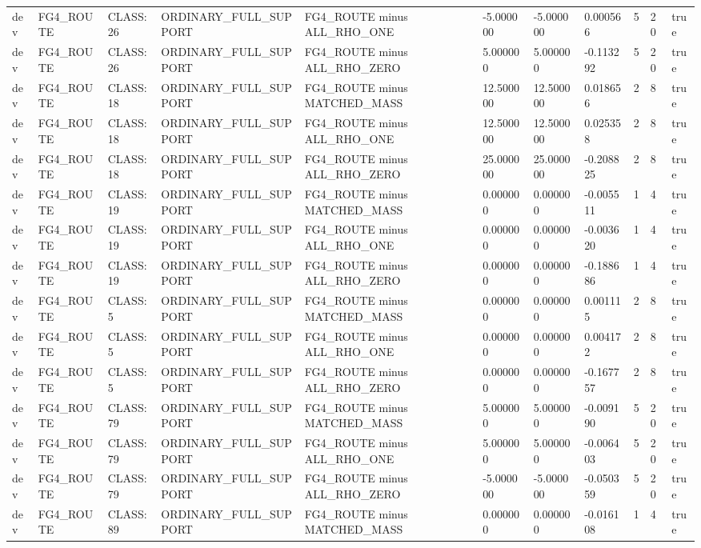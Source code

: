 \begin{tabular}{lllllllllll}
dev & FG4\_ROUTE & CLASS:26 & ORDINARY\_FULL\_SUPPORT & FG4\_ROUTE minus ALL\_RHO\_ONE & -5.000000 & -5.000000 & 0.000566 & 5 & 20 & true \\
dev & FG4\_ROUTE & CLASS:26 & ORDINARY\_FULL\_SUPPORT & FG4\_ROUTE minus ALL\_RHO\_ZERO & 5.000000 & 5.000000 & -0.113292 & 5 & 20 & true \\
dev & FG4\_ROUTE & CLASS:18 & ORDINARY\_FULL\_SUPPORT & FG4\_ROUTE minus MATCHED\_MASS & 12.500000 & 12.500000 & 0.018656 & 2 & 8 & true \\
dev & FG4\_ROUTE & CLASS:18 & ORDINARY\_FULL\_SUPPORT & FG4\_ROUTE minus ALL\_RHO\_ONE & 12.500000 & 12.500000 & 0.025358 & 2 & 8 & true \\
dev & FG4\_ROUTE & CLASS:18 & ORDINARY\_FULL\_SUPPORT & FG4\_ROUTE minus ALL\_RHO\_ZERO & 25.000000 & 25.000000 & -0.208825 & 2 & 8 & true \\
dev & FG4\_ROUTE & CLASS:19 & ORDINARY\_FULL\_SUPPORT & FG4\_ROUTE minus MATCHED\_MASS & 0.000000 & 0.000000 & -0.005511 & 1 & 4 & true \\
dev & FG4\_ROUTE & CLASS:19 & ORDINARY\_FULL\_SUPPORT & FG4\_ROUTE minus ALL\_RHO\_ONE & 0.000000 & 0.000000 & -0.003620 & 1 & 4 & true \\
dev & FG4\_ROUTE & CLASS:19 & ORDINARY\_FULL\_SUPPORT & FG4\_ROUTE minus ALL\_RHO\_ZERO & 0.000000 & 0.000000 & -0.188686 & 1 & 4 & true \\
dev & FG4\_ROUTE & CLASS:5 & ORDINARY\_FULL\_SUPPORT & FG4\_ROUTE minus MATCHED\_MASS & 0.000000 & 0.000000 & 0.001115 & 2 & 8 & true \\
dev & FG4\_ROUTE & CLASS:5 & ORDINARY\_FULL\_SUPPORT & FG4\_ROUTE minus ALL\_RHO\_ONE & 0.000000 & 0.000000 & 0.004172 & 2 & 8 & true \\
dev & FG4\_ROUTE & CLASS:5 & ORDINARY\_FULL\_SUPPORT & FG4\_ROUTE minus ALL\_RHO\_ZERO & 0.000000 & 0.000000 & -0.167757 & 2 & 8 & true \\
dev & FG4\_ROUTE & CLASS:79 & ORDINARY\_FULL\_SUPPORT & FG4\_ROUTE minus MATCHED\_MASS & 5.000000 & 5.000000 & -0.009190 & 5 & 20 & true \\
dev & FG4\_ROUTE & CLASS:79 & ORDINARY\_FULL\_SUPPORT & FG4\_ROUTE minus ALL\_RHO\_ONE & 5.000000 & 5.000000 & -0.006403 & 5 & 20 & true \\
dev & FG4\_ROUTE & CLASS:79 & ORDINARY\_FULL\_SUPPORT & FG4\_ROUTE minus ALL\_RHO\_ZERO & -5.000000 & -5.000000 & -0.050359 & 5 & 20 & true \\
dev & FG4\_ROUTE & CLASS:89 & ORDINARY\_FULL\_SUPPORT & FG4\_ROUTE minus MATCHED\_MASS & 0.000000 & 0.000000 & -0.016108 & 1 & 4 & true \\

\end{tabular}
